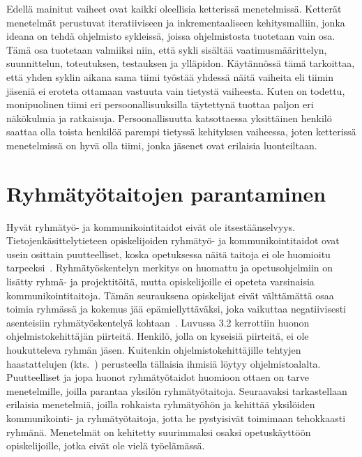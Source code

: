 \documentclass[finnish]{../tktltiki2}
\theoremstyle{definition}
\theoremstyle{remark}
\begin{document}
Edellä mainitut vaiheet ovat kaikki oleellisia ketterissä menetelmissä. Ketterät menetelmät perustuvat iteratiiviseen ja inkrementaaliseen kehitysmalliin, jonka ideana on tehdä ohjelmisto sykleissä, joissa ohjelmistosta tuotetaan vain osa. Tämä osa tuotetaan valmiiksi niin, että sykli sisältää vaatimusmäärittelyn, suunnittelun, toteutuksen, testauksen ja ylläpidon. Käytännössä tämä tarkoittaa, että yhden syklin aikana sama tiimi työstää yhdessä näitä vaiheita eli tiimin jäseniä ei eroteta ottamaan vastuuta vain tietystä vaiheesta. Kuten on todettu, monipuolinen tiimi eri persoonallisuuksilla täytettynä tuottaa paljon eri näkökulmia ja ratkaisuja. Persoonallisuutta katsottaessa yksittäinen henkilö saattaa olla toista henkilöä parempi tietyssä kehityksen vaiheessa, joten ketterissä menetelmissä on hyvä olla tiimi, jonka jäsenet ovat erilaisia luonteiltaan.

\section{Ryhmätyötaitojen parantaminen}

Hyvät ryhmätyö- ja kommunikointitaidot eivät ole itsestäänselvyys. Tietojenkäsittelytieteen opiskelijoiden ryhmätyö- ja kommunikointitaidot ovat usein osittain puutteelliset, koska opetuksessa näitä taitoja ei ole huomioitu tarpeeksi~\cite{Cushing:2003:TBP:948785.948797,5593527,Waite:2004:SCV:1028174.971308}. Ryhmätyöskentelyn merkitys on huomattu ja
opetusohjelmiin on lisätty ryhmä- ja projektitöitä, mutta opiskelijoille ei opeteta varsinaisia kommunikointitaitoja. Tämän seurauksena opiskelijat eivät välttämättä osaa toimia ryhmässä ja kokemus jää epämiellyttäväksi, joka vaikuttaa negatiivisesti asenteisiin ryhmätyöskentelyä kohtaan~\cite{1158709}.
Luvussa 3.2 kerrottiin huonon ohjelmistokehittäjän piirteitä. Henkilö, jolla on kyseisiä piirteitä, ei ole houkutteleva ryhmän jäsen. Kuitenkin ohjelmistokehittäjille tehtyjen haastattelujen (kts.~\cite{Begel:2008:PPW:1414004.1414026,Hall:2007:CNT:1235000.1235043}) perusteella tällaisia ihmisiä löytyy ohjelmistoalalta.\\

Puutteelliset ja jopa huonot ryhmätyötaidot huomioon ottaen on tarve menetelmille, joilla parantaa yksilön ryhmätyötaitoja.
Seuraavaksi tarkastellaan erilaisia menetelmiä, joilla
rohkaista ryhmätyöhön ja kehittää yksilöiden kommunikointi- ja ryhmätyötaitoja, jotta he pystyisivät toimimaan tehokkaasti ryhmänä. Menetelmät on
kehitetty suurimmaksi osaksi opetuskäyttöön opiskelijoille,
jotka eivät ole vielä työelämässä.
\end{document}
